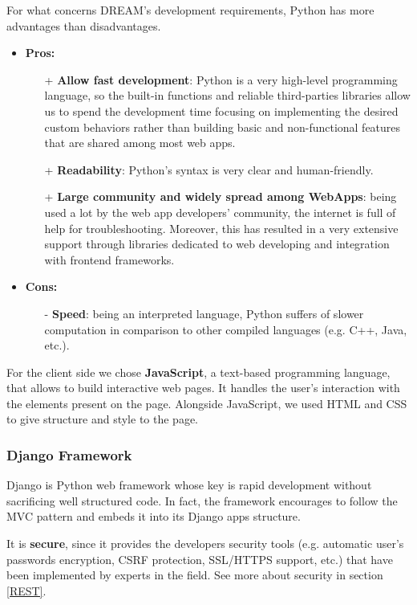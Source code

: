 \documentclass[table, 12pt]{article}
\begin{document}
For what concerns DREAM's development requirements, Python has more advantages than disadvantages.
\begin{itemize}
    \item \textbf{Pros:}
    \begin{itemize}
        \item[+] \textbf{Allow fast development}: Python is a very high-level programming language, so the built-in functions and reliable third-parties libraries allow us to spend the development time focusing on implementing the desired custom behaviors rather than building basic and non-functional features that are shared among most web apps.
        \item[+] \textbf{Readability}: Python's syntax is very clear and human-friendly.
        \item[+] \textbf{Large community and widely spread among WebApps}: being used a lot by the web app developers' community, the internet is full of help for troubleshooting. Moreover, this has resulted in a very extensive support through libraries dedicated to web developing and integration with frontend frameworks.
    \end{itemize}
    \item \textbf{Cons:}
    \begin{itemize}
        \item[-] \textbf{Speed}: being an interpreted language, Python suffers of slower computation in comparison to other compiled languages (e.g. C++, Java, etc.).
    \end{itemize}
\end{itemize}

For the client side we chose \textbf{JavaScript}, a text-based programming language, that allows to build interactive web pages. It handles the user's interaction with the elements present on the page.
Alongside JavaScript, we used HTML and CSS to give structure and style to the page.

\subsubsection{Django Framework}
Django is Python web framework whose key is rapid development without sacrificing well structured code. In fact, the framework encourages to follow the MVC pattern and embeds it into its Django apps structure.

It is \textbf{secure}, since it provides the developers security tools (e.g. automatic user's passwords encryption, CSRF protection, SSL/HTTPS support, etc.) that have been implemented by experts in the field. See more about security in section \ref{REST}.
\end{document}
